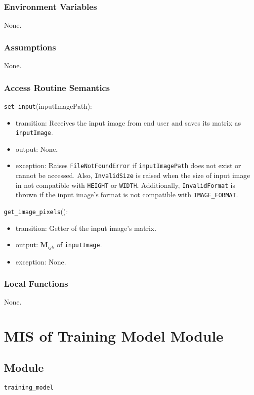 \documentclass[12pt, titlepage]{article}
\def\code#1{\texttt{#1}}
\begin{document}
\subsubsection{Environment Variables}
None.

\subsubsection{Assumptions}
None.

\subsubsection{Access Routine Semantics}

\noindent \code{set\_input}(inputImagePath):
\begin{itemize}
  \item transition: Receives the input image from end user and saves its matrix as \code{inputImage}.
  \item output: None.
  \item exception: Raises \code{FileNotFoundError} if \code{inputImagePath} does not exist or cannot be accessed. 
  Also, \code{InvalidSize} is raised when the size of input image in not compatible with \code{HEIGHT} or 
  \code{WIDTH}. Additionally, \code{InvalidFormat} is thrown if the input image's format is 
  not compatible with \code{IMAGE\_FORMAT}.
\end{itemize}

\noindent \code{get\_image\_pixels}():
\begin{itemize}
  \item transition: Getter of the input image's matrix.
  \item output: $\mathbf{M}_{ijk}$ of \code{inputImage}.
  \item exception: None.
\end{itemize}


\subsubsection{Local Functions}
None.

\newpage

\section{MIS of Training Model Module} \label{Train-Model} 

\subsection{Module}
\code{training\_model} 
\end{document}
